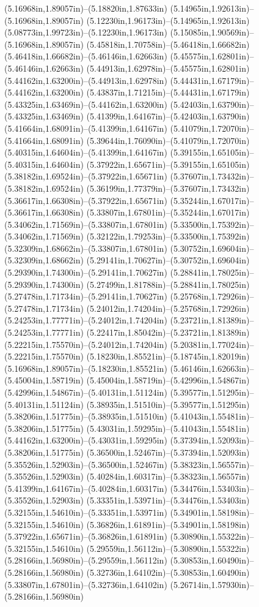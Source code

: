 (5.16968in,1.89057in)--(5.18820in,1.87633in) (5.14965in,1.92613in)--(5.16968in,1.89057in) (5.12230in,1.96173in)--(5.14965in,1.92613in) (5.08773in,1.99723in)--(5.12230in,1.96173in) (5.15085in,1.90569in)--(5.16968in,1.89057in) (5.45818in,1.70758in)--(5.46418in,1.66682in) (5.46418in,1.66682in)--(5.46146in,1.62663in) (5.45575in,1.62801in)--(5.46146in,1.62663in) (5.44913in,1.62978in)--(5.45575in,1.62801in) (5.44162in,1.63200in)--(5.44913in,1.62978in) (5.44431in,1.67179in)--(5.44162in,1.63200in) (5.43837in,1.71215in)--(5.44431in,1.67179in) (5.43325in,1.63469in)--(5.44162in,1.63200in) (5.42403in,1.63790in)--(5.43325in,1.63469in) (5.41399in,1.64167in)--(5.42403in,1.63790in) (5.41664in,1.68091in)--(5.41399in,1.64167in) (5.41079in,1.72070in)--(5.41664in,1.68091in) (5.39644in,1.76090in)--(5.41079in,1.72070in) (5.40315in,1.64604in)--(5.41399in,1.64167in) (5.39155in,1.65105in)--(5.40315in,1.64604in) (5.37922in,1.65671in)--(5.39155in,1.65105in) (5.38182in,1.69524in)--(5.37922in,1.65671in) (5.37607in,1.73432in)--(5.38182in,1.69524in) (5.36199in,1.77379in)--(5.37607in,1.73432in) (5.36617in,1.66308in)--(5.37922in,1.65671in) (5.35244in,1.67017in)--(5.36617in,1.66308in) (5.33807in,1.67801in)--(5.35244in,1.67017in) (5.34062in,1.71569in)--(5.33807in,1.67801in) (5.33500in,1.75392in)--(5.34062in,1.71569in) (5.32122in,1.79253in)--(5.33500in,1.75392in) (5.32309in,1.68662in)--(5.33807in,1.67801in) (5.30752in,1.69604in)--(5.32309in,1.68662in) (5.29141in,1.70627in)--(5.30752in,1.69604in) (5.29390in,1.74300in)--(5.29141in,1.70627in) (5.28841in,1.78025in)--(5.29390in,1.74300in) (5.27499in,1.81788in)--(5.28841in,1.78025in) (5.27478in,1.71734in)--(5.29141in,1.70627in) (5.25768in,1.72926in)--(5.27478in,1.71734in) (5.24012in,1.74204in)--(5.25768in,1.72926in) (5.24253in,1.77771in)--(5.24012in,1.74204in) (5.23721in,1.81389in)--(5.24253in,1.77771in) (5.22417in,1.85042in)--(5.23721in,1.81389in) (5.22215in,1.75570in)--(5.24012in,1.74204in) (5.20381in,1.77024in)--(5.22215in,1.75570in) (5.18230in,1.85521in)--(5.18745in,1.82019in) (5.16968in,1.89057in)--(5.18230in,1.85521in) (5.46146in,1.62663in)--(5.45004in,1.58719in) (5.45004in,1.58719in)--(5.42996in,1.54867in) (5.42996in,1.54867in)--(5.40131in,1.51124in) (5.39577in,1.51295in)--(5.40131in,1.51124in) (5.38935in,1.51510in)--(5.39577in,1.51295in) (5.38206in,1.51775in)--(5.38935in,1.51510in) (5.41043in,1.55481in)--(5.38206in,1.51775in) (5.43031in,1.59295in)--(5.41043in,1.55481in) (5.44162in,1.63200in)--(5.43031in,1.59295in) (5.37394in,1.52093in)--(5.38206in,1.51775in) (5.36500in,1.52467in)--(5.37394in,1.52093in) (5.35526in,1.52903in)--(5.36500in,1.52467in) (5.38323in,1.56557in)--(5.35526in,1.52903in) (5.40284in,1.60317in)--(5.38323in,1.56557in) (5.41399in,1.64167in)--(5.40284in,1.60317in) (5.34476in,1.53403in)--(5.35526in,1.52903in) (5.33351in,1.53971in)--(5.34476in,1.53403in) (5.32155in,1.54610in)--(5.33351in,1.53971in) (5.34901in,1.58198in)--(5.32155in,1.54610in) (5.36826in,1.61891in)--(5.34901in,1.58198in) (5.37922in,1.65671in)--(5.36826in,1.61891in) (5.30890in,1.55322in)--(5.32155in,1.54610in) (5.29559in,1.56112in)--(5.30890in,1.55322in) (5.28166in,1.56980in)--(5.29559in,1.56112in) (5.30853in,1.60490in)--(5.28166in,1.56980in) (5.32736in,1.64102in)--(5.30853in,1.60490in) (5.33807in,1.67801in)--(5.32736in,1.64102in) (5.26714in,1.57930in)--(5.28166in,1.56980in) 